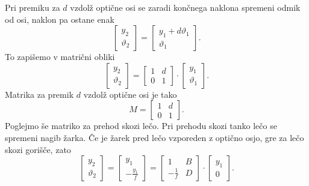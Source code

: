 Pri premiku za $d$ vzdolž optične osi se zaradi končnega naklona 
spremeni odmik od osi, naklon pa ostane enak
\begin{equation}
\left[\begin{array}{c}
y_{2}\\
\vartheta_{2}
\end{array}\right]=\left[\begin{array}{c}
y_{1}+d\vartheta_{1}\\
\vartheta_{1}
\end{array}\right].
\end{equation}
To zapišemo v matrični obliki
\begin{equation}
\left[\begin{array}{c}
y_{2}\\
\vartheta_{2}
\end{array}\right]=\left[\begin{array}{cc}
1 & d\\
0 & 1
\end{array}\right]\cdot\left[\begin{array}{c}
y_{1}\\
\vartheta_{1}
\end{array}\right].
\end{equation}
Matrika za premik $d$ vzdolž optične osi je tako
\begin{equation}
M= \left[\begin{array}{cc}
1 & d\\
0 & 1
\end{array}\right].
\label{eq:MABCD1}
\end{equation}
Poglejmo še matriko za prehod skozi lečo. 
Pri prehodu skozi tanko lečo se spremeni nagib žarka. Če je žarek pred
lečo vzporeden z optično osjo, gre za lečo skozi gorišče, zato 
\begin{equation}
\left[\begin{array}{c}
y_{2}\\
\vartheta_{2}
\end{array}\right]=\left[\begin{array}{c}
y_{1}\\
-\frac{y_{1}}{f}
\end{array}\right]=\left[\begin{array}{cc}
1 & B\\
-\frac{1}{f} & D
\end{array}\right]\cdot\left[\begin{array}{c}
y_{1}\\
0
\end{array}\right].
\end{equation}
